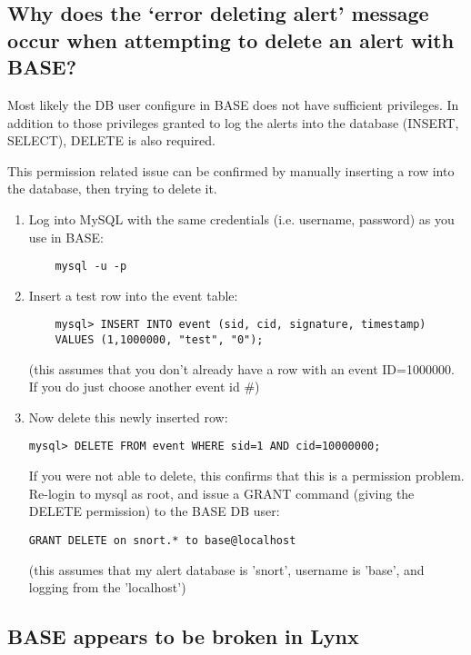 \documentclass{article}
\begin{document}
\subsection{Why does the `error deleting alert' message occur when attempting to delete an alert with BASE?  }

Most likely the DB user configure in BASE does not have sufficient
privileges. In addition to those privileges granted to log the alerts into
the database (INSERT, SELECT), DELETE is also required. 

This permission related issue can be confirmed by manually inserting a row
into the database, then trying to delete it. 

\begin{enumerate}
\item Log into MySQL with the same credentials (i.e. username, password) as you use in BASE:
	\begin{verbatim}
	mysql -u -p
	\end{verbatim}
\item Insert a test row into the event table: 
	\begin{verbatim}
	mysql> INSERT INTO event (sid, cid, signature, timestamp) 
	VALUES (1,1000000, "test", "0");
	\end{verbatim}
	(this assumes that you don't already have a row with an event ID=1000000. If
	you do just choose another event id \#) 

\item Now delete this newly inserted row:

\begin{verbatim}mysql> DELETE FROM event WHERE sid=1 AND cid=10000000; \end{verbatim}

If you were not able to delete, this confirms that this is a permission
problem. Re-login to mysql as root, and issue a GRANT command (giving the
DELETE permission) to the BASE DB user: 

\begin{verbatim}GRANT DELETE on snort.* to base@localhost\end{verbatim}

(this assumes that my alert database is 'snort', username is 'base', and
logging from the 'localhost') 

\end{enumerate}
\subsection{BASE appears to be broken in Lynx }
\end{document}
